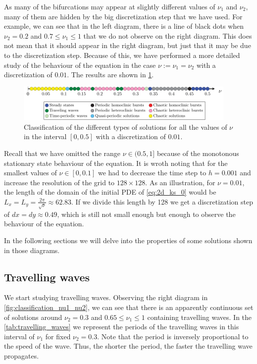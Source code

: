 \documentclass[twoside]{article}
\begin{document}
As many of the bifurcations may appear at slightly different values of $\nu_1$ and $\nu_2$, many of them are hidden by the big discretization step that we have used. For example, we can see that in the left diagram, there is a line of black dots when $\nu_2=0.2$ and $0.7\leq \nu_1 \leq 1$ that we do not observe on the right diagram. This does not mean that it should appear in the right diagram, but just that it may be due to the discretization step. Because of this, we have performed a more detailed study of the behaviour of the equation in the case $\nu:=\nu_1=\nu_2$ with a discretization of $0.01$. The results are shown in \cref{fig:classification_nu}.

\begin{figure}[ht]
  \centering
  \includegraphics[width=0.95\textwidth]{images/nu1=nu2.pdf}
  \caption{Classification of the different types of solutions for all the values of $\nu$ in the interval $[0,0.5]$ with a discretization of $0.01$.}
  \label{fig:classification_nu}
\end{figure}

Recall that we have omitted the range $\nu\in(0.5,1]$ because of the monotonous stationary state behaviour of the equation. It is wroth noting that for the smallest values of $\nu\in[0,0.1]$ we had to decrease the time step to $h=0.001$ and increase the resolution of the grid to $128\times 128$. As an illustration, for $\nu=0.01$, the length of the domain of the initial PDE of \cref{eq:2d_ks_0} would be $L_x=L_y=\frac{2\pi}{\sqrt{\nu}}\approx 62.83$. If we divide this length by 128 we get a discretization step of $dx=dy\approx 0.49$, which is still not small enough but enough to observe the behaviour of the equation.

In the following sections we will delve into the properties of some solutions shown in those diagrams.
\subsection{Travelling waves}\label{sec:travelling_waves}
We start studying travelling waves. Observing the right diagram in \cref{fig:classification_nu1_nu2}, we can see that there is an apparently continuous set of solutions around $\nu_2=0.3$ and $0.65\leq \nu_1\leq 1$ containing travelling waves. In the \cref{tab:travelling_waves} we represent the periods of the travelling waves in this interval of $\nu_1$ for fixed $\nu_2=0.3$. Note that the period is inversely proportional to the speed of the wave. Thus, the shorter the period, the faster the travelling wave propagates.
\end{document}
